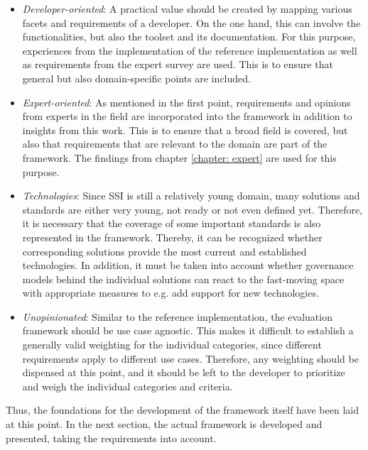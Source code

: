 	\begin{itemize}
	    \item \textit{Developer-oriented}: A practical value should be created by mapping various facets and requirements of a developer. On the one hand, this can involve the functionalities, but also the toolset and its documentation. For this purpose, experiences from the implementation of the reference implementation as well as requirements from the expert survey are used. This is to ensure that general but also domain-specific points are included. %
	    \item \textit{Expert-oriented}: As mentioned in the first point, requirements and opinions from experts in the field are incorporated into the framework in addition to insights from this work. This is to ensure that a broad field is covered, but also that requirements that are relevant to the domain are part of the framework. The findings from chapter \ref{chapter: expert} are used for this purpose.  %
	    \item \textit{Technologies}: Since \ac{SSI} is still a relatively young domain, many solutions and standards are either very young, not ready or not even defined yet. Therefore, it is necessary that the coverage of some important standards is also represented in the framework. Thereby, it can be recognized whether corresponding solutions provide the most current and established technologies. In addition, it must be taken into account whether governance models behind the individual solutions can react to the fast-moving space with appropriate measures to e.g. add support for new technologies.  %
	    \item \textit{Unopinionated}: Similar to the reference implementation, the evaluation framework should be use case agnostic. This makes it difficult to establish a generally valid weighting for the individual categories, since different requirements apply to different use cases. Therefore, any weighting should be dispensed at this point, and it should be left to the developer to prioritize and weigh the individual categories and criteria.
	\end{itemize}
	
	Thus, the foundations for the development of the framework itself have been laid at this point. In the next section, the actual framework is developed and presented, taking the requirements into account.
	
